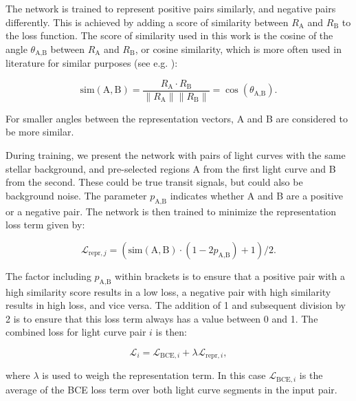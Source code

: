The network is trained to represent positive pairs similarly, and negative pairs differently. This is achieved by adding a score of similarity between $R_\text{A}$ and $R_\text{B}$ to the loss function. The score of similarity used in this work is the cosine of the angle $\theta_{\text{A}, \text{B}}$ between $R_\text{A}$ and $R_\text{B}$, or cosine similarity, which is more often used in literature for similar purposes (see e.g. \cite{dong2006cosine}):

\begin{equation}
    \text{sim}(\text{A}, \text{B})  = \frac{R_\text{A} \cdot R_\text{B}}{\|R_\text{A}\|\|R_\text{B}\|} = \cos(\theta_{\text{A}, \text{B}}).
\end{equation}

\noindent For smaller angles between the representation vectors, A and B are considered to be more similar.

During training, we present the network with pairs of light curves with the same stellar background, and pre-selected regions A from the first light curve and B from the second. These could be true transit signals, but could also be background noise. The parameter $p_{\text{A},\text{B}}$ indicates whether A and B are a positive or a negative pair. The network is then trained to minimize the representation loss term given by:

\begin{equation}
   \mathcal{L}_{\text{repr}, j} =(\text{sim}(\text{A}, \text{B}) \cdot(1 - 2  p_{\text{A},\text{B}}) + 1) / 2.
\end{equation}

\noindent The factor including $p_{\text{A},\text{B}}$ within brackets is to ensure that a positive pair with a high similarity score results in a low loss, a negative pair with high similarity results in high loss, and vice versa. The addition of 1 and subsequent division by 2 is to ensure that this loss term always has a value between 0 and 1. The combined loss for light curve pair $i$ is then:

\begin{equation}
    \mathcal{L}_{i} = \mathcal{L}_{\text{BCE}, i} + \lambda_{} \mathcal{L}_{\text{repr}, i},
\end{equation}

\noindent where $\lambda$ is used to weigh the representation term. In this case $\mathcal{L}_{\text{BCE}, i}$ is the average of the BCE loss term over both light curve segments in the input pair.
